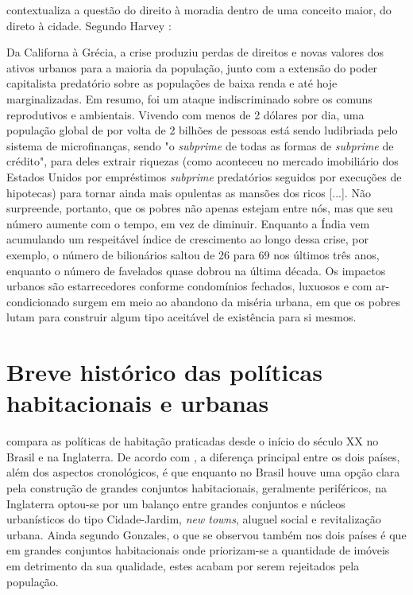 \documentclass[
	12pt,				%
	oneside,			%
	a4paper,			%
	chapter=TITLE,		%
	section=TITLE,		%
	english,			%
	brazil				%
	]{abntex2}
\begin{document}
\begin{refsection}
\textcite{harvey} contextualiza a questão do direito à moradia dentro de uma conceito
maior, do direto à cidade. Segundo Harvey \autocite*[166]{harvey}:
\begin{citacao}
Da Californa à Grécia, a crise produziu perdas de direitos e novas valores dos
ativos urbanos para a maioria da população, junto com a extensão do poder
capitalista predatório sobre as populações de baixa renda e até hoje
marginalizadas. Em resumo, foi um ataque indiscriminado sobre os comuns
reprodutivos e ambientais. Vivendo com menos de 2 dólares por dia, uma população
global de por volta de 2 bilhões de pessoas está sendo ludibriada pelo sistema
de microfinanças, sendo "o \emph{subprime} de todas as formas de \emph{subprime}
de crédito", para deles extrair riquezas (como aconteceu no mercado imobiliário
dos Estados Unidos por empréstimos \emph{subprime} predatórios seguidos por
execuções de hipotecas) para tornar ainda mais opulentas as mansões dos ricos
[...]. Não surpreende, portanto, que os pobres não apenas estejam entre nós, mas
que seu número aumente com o tempo, em vez de diminuir. Enquanto a Índia vem
acumulando um respeitável índice de crescimento ao longo dessa crise, por
exemplo, o número de bilionários saltou de 26 para 69 nos últimos três anos,
enquanto o número de favelados quase dobrou na última década. Os impactos
urbanos são estarrecedores conforme condomínios fechados, luxuosos e com
ar-condicionado surgem em meio ao abandono da miséria urbana, em que os pobres
lutam para construir algum tipo aceitável de existência para si mesmos.
\end{citacao}
\hypertarget{breve-histuxf3rico-das-poluxedticas-habitacionais-e-urbanas}{%
\section{Breve histórico das políticas habitacionais e urbanas}\label{breve-histuxf3rico-das-poluxedticas-habitacionais-e-urbanas}}

\textcite{jung2018} compara as políticas de habitação praticadas desde o início do século
XX no Brasil e na Inglaterra. De acordo com \textcite[p.~165]{jung2018}, a diferença
principal entre os dois países, além dos aspectos cronológicos, é que enquanto
no Brasil houve uma opção clara pela construção de grandes conjuntos
habitacionais, geralmente periféricos, na Inglaterra optou-se por um balanço
entre grandes conjuntos e núcleos urbanísticos do tipo Cidade-Jardim, \emph{new
towns}, aluguel social e revitalização urbana. Ainda segundo Gonzales, o que
se observou também nos dois países é que em grandes conjuntos habitacionais
onde priorizam-se a quantidade de imóveis em detrimento da sua qualidade,
estes acabam por serem rejeitados pela população.


\end{refsection}
\end{document}
